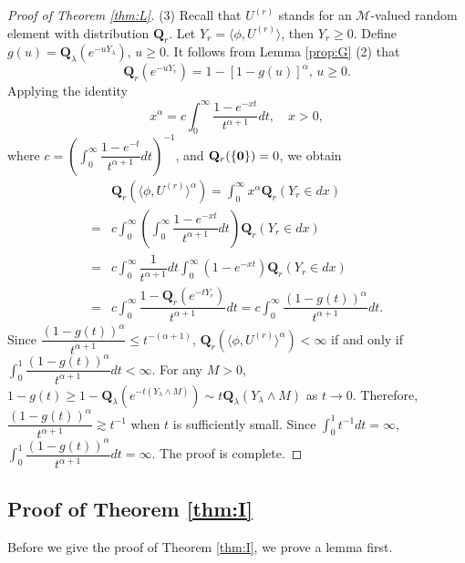 \documentclass[12pt,a4paper]{amsart}
\numberwithin{equation}{section}
\theoremstyle{plain}
\theoremstyle{definition}
\theoremstyle{remark}
\begin{document}
\begin{proof}[Proof of Theorem \ref{thm:L}]
(3)
Recall that $U^{(r)}$ stands for an $\mathcal M$-valued random element with distribution $\mathbf Q_r$. Let $Y_r=\langle\phi, U^{(r)}\rangle$, then $Y_r\geq 0$.
Define $g(u)=\mathbf Q_\lambda\left(e^{-uY_\lambda}\right),\, u\geq 0$.
It follows from Lemma \ref{prop:G} (2) that
$$
\mathbf Q_r\left(e^{-uY_r}\right)=1-[1-g(u)]^\alpha,\, u\geq 0.
$$
Applying the identity
\[
x^\alpha=c\int_0^\infty\dfrac{1-e^{-xt}}{t^{\alpha+1}}dt,
\quad x>0,
\]
where $c=\left(\int_0^\infty\dfrac{1-e^{-t}}{t^{\alpha+1}}dt\right)^{-1}$, and $\mathbf Q_r(\{{\bf 0}\})=0$, we obtain
\begin{align*}
&\mathbf Q_r(\langle\phi, U^{(r)}\rangle^{\alpha})=\int_0^\infty x^\alpha \mathbf Q_r(Y_r\in dx)\\
=&c\int_0^\infty \left(\int_0^\infty\dfrac{1-e^{-xt}}{t^{\alpha+1}}dt \right)\mathbf Q_r(Y_r\in dx)\\
=&c\int_0^\infty\dfrac{1}{t^{\alpha+1}}dt\int_0^\infty\left(1-e^{-xt}\right)\mathbf Q_r(Y_r\in dx)\\
=&c\int_0^\infty\dfrac{1-\mathbf Q_r\left(e^{-tY_r}\right)}{t^{\alpha+1}}dt
=c\int_0^\infty\dfrac{(1-g(t))^\alpha}{t^{\alpha+1}}dt.
\end{align*}
Since $\dfrac{(1-g(t))^\alpha}{t^{\alpha+1}}\leq t^{-(\alpha+1)}$, $\mathbf Q_r(\langle\phi, U^{(r)}\rangle^{\alpha})<\infty$ if and only if $\int_0^1\dfrac{(1-g(t))^\alpha}{t^{\alpha+1}}dt<\infty$.
For any $M>0$, $1-g(t)\geq 1-\mathbf Q_\lambda\left(e^{-t(Y_\lambda\wedge M)}\right)\sim t \mathbf Q_\lambda(Y_\lambda\wedge M)$ as $t\to 0$. Therefore,
$\dfrac{(1-g(t))^\alpha}{t^{\alpha+1}}\gtrsim t^{-1}$ when $t$ is sufficiently small.  Since $\int_0^1 t^{-1}dt=\infty$,
$\int_0^1\dfrac{(1-g(t))^\alpha}{t^{\alpha+1}}dt=\infty$. The proof is complete.
\end{proof}

\subsection{Proof of Theorem \ref{thm:I}}
Before we give the proof  of Theorem \ref{thm:I}, we prove a lemma first.
\end{document}
